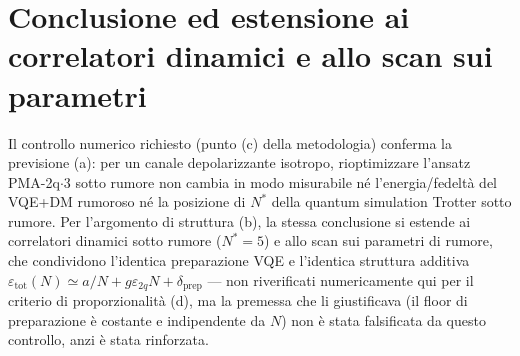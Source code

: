 \documentclass[11pt,a4paper]{article}
\begin{document}
\section*{Conclusione ed estensione ai correlatori dinamici e allo scan sui parametri}

Il controllo numerico richiesto (punto (c) della metodologia) conferma la
previsione (a): per un canale depolarizzante isotropo, rioptimizzare
l'ansatz PMA-2q$\cdot$3 sotto rumore non cambia in modo misurabile né
l'energia/fedeltà del VQE+DM rumoroso né la posizione di $N^*$ della
quantum simulation Trotter sotto rumore. Per l'argomento di struttura
(b), la stessa conclusione si estende ai correlatori dinamici sotto
rumore ($N^*=5$) e allo scan sui parametri di rumore, che
condividono l'identica preparazione VQE e l'identica struttura additiva
$\varepsilon_\text{tot}(N)\simeq a/N+g\varepsilon_{2q}N+\delta_\text{prep}$
--- non riverificati numericamente qui per il criterio di
proporzionalità (d), ma la premessa che li giustificava (il floor di
preparazione è costante e indipendente da $N$) non è stata falsificata da
questo controllo, anzi è stata rinforzata.
\end{document}
